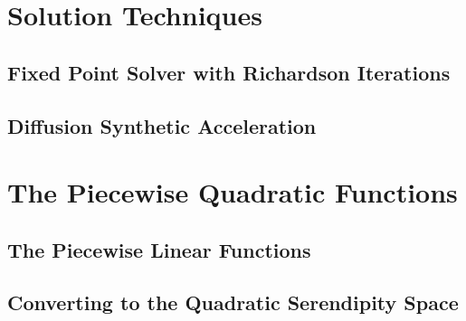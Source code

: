 \documentclass[preprint,review,10pt]{elsarticle}
\begin{document}
\section{Solution Techniques} \label{sec::Solve}

\subsection{Fixed Point Solver with Richardson Iterations} \label{sec::Solve_Rich}


\subsection{Diffusion Synthetic Acceleration} \label{sec::Solve_DSA}


\section{The Piecewise Quadratic Functions} \label{sec::PWQ}

\subsection{The Piecewise Linear Functions} \label{sec::PWQ_PWL}

\subsection{Converting to the Quadratic Serendipity Space} \label{sec::PWQ_Ser}
\end{document}
